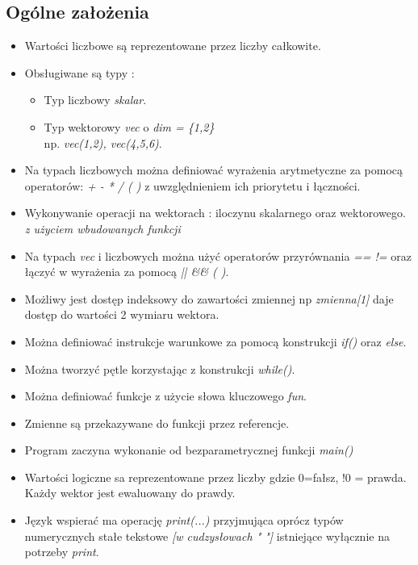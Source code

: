 \documentclass[11pt]{article} %
\begin{document}
\subsection{Ogólne założenia}
\begin{itemize}
	\item 
		Wartości liczbowe są reprezentowane przez liczby całkowite.
	\item
		Obsługiwane są typy : 
		\begin{itemize}
			\item 
				Typ liczbowy \textsl{skalar}.
			\item
				Typ wektorowy \textsl{vec} o \textsl{dim = \{1,2\}}\\ np. \textsl{vec(1,2), vec(4,5,6)}.
		\end{itemize}
	\item
		Na typach liczbowych można definiować wyrażenia arytmetyczne za pomocą operatorów: \textsl{+ - * / ( )} z uwzględnieniem ich priorytetu i łączności.
	\item
		Wykonywanie operacji na wektorach : iloczynu skalarnego oraz wektorowego. \textsl{z użyciem wbudowanych funkcji}
	\item
		Na typach \textsl{vec} i liczbowych można użyć operatorów przyrównania \textsl{== !=} oraz łączyć w wyrażenia za pomocą \textsl{|| \&\& ( )}.
	\item
		Możliwy jest dostęp indeksowy do zawartości zmiennej np \textsl{ zmienna[1]} daje dostęp do wartości 2 wymiaru wektora. 
	\item
		Można definiować instrukcje warunkowe za pomocą konstrukcji \textsl{if()} oraz \textsl{else}.
	\item
		Można tworzyć pętle korzystając z konstrukcji \textsl{while()}.
	\item
		Można definiować funkcje z użycie słowa kluczowego \textsl{fun}.
	\item
		Zmienne są przekazywane do funkcji przez referencje.
	\item
		Program zaczyna wykonanie od bezparametrycznej funkcji \textsl{main()}
	\item 
		Wartości logiczne sa reprezentowane przez liczby gdzie 0=fałsz, !0 = prawda. Każdy wektor jest ewaluowany do prawdy.
	\item
		Język wspierać ma operację \textsl{print(...)} przyjmująca oprócz typów numerycznych stałe tekstowe \textsl{[w cudzysłowach " "]} istniejące wyłącznie na potrzeby \textsl{print}.
\end{itemize}
\end{document}
